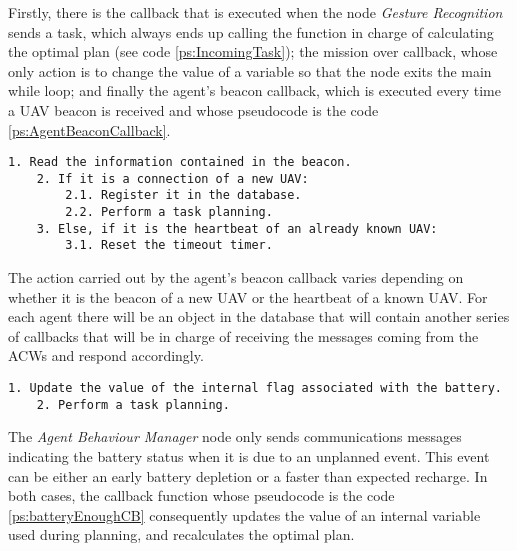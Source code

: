 Firstly, there is the callback that is executed when the node \emph{Gesture Recognition} sends a task, which always ends up calling the function in charge of calculating the optimal plan (see code \ref{ps:IncomingTask}); the mission over callback, whose only action is to change the value of a variable so that the node exits the main while loop; and finally the agent's beacon callback, which is executed every time a \gls{UAV} beacon is received and whose pseudocode is the code \ref{ps:AgentBeaconCallback}.

\begin{lstlisting}[caption={Agent's beacon callback}, breaklines=true, label=ps:AgentBeaconCallback]
	1. Read the information contained in the beacon.
	2. If it is a connection of a new UAV:
		2.1. Register it in the database.
		2.2. Perform a task planning.
	3. Else, if it is the heartbeat of an already known UAV:
		3.1. Reset the timeout timer.
\end{lstlisting}

The action carried out by the agent's beacon callback varies depending on whether it is the beacon of a new \gls{UAV} or the heartbeat of a known \gls{UAV}. For each agent there will be an object in the database that will contain another series of callbacks that will be in charge of receiving the messages coming from the \glspl{ACW} and respond accordingly.

\begin{lstlisting}[caption={Callback that runs when an \emph{Agent Behaviour Manager} sends battery feedback}, breaklines=true, label=ps:batteryEnoughCB]
	1. Update the value of the internal flag associated with the battery.
	2. Perform a task planning.
\end{lstlisting}

The \emph{Agent Behaviour Manager} node only sends communications messages indicating the battery status when it is due to an unplanned event. This event can be either an early battery depletion or a faster than expected recharge. In both cases, the callback function whose pseudocode is the code \ref{ps:batteryEnoughCB} consequently updates the value of an internal variable used during planning, and recalculates the optimal plan.


